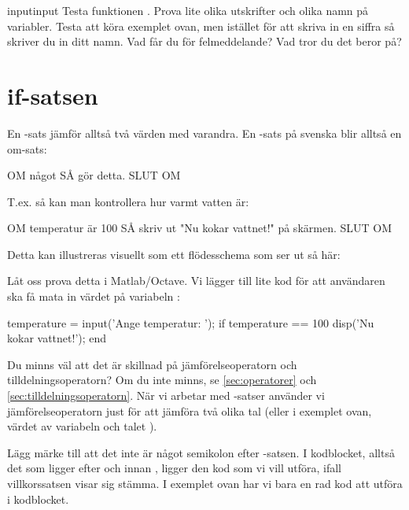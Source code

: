 \begin{matteovning}{input}{input}
Testa funktionen . Prova lite olika utskrifter och olika namn på variabler.
\newline
\newline
Testa att köra exemplet ovan, men istället för att skriva in en siffra så skriver du in ditt namn. Vad får du för felmeddelande? Vad tror du det beror på?
\end{matteovning}


\section{if-satsen}
En -sats jämför alltså två värden med varandra. En -sats på svenska blir alltså en om-sats:

\begin{pseudo}
OM något SÅ
	gör detta.
SLUT OM
\end{pseudo}

T.ex. så kan man kontrollera hur varmt vatten är:

\begin{pseudo}
OM temperatur är 100 SÅ
	skriv ut "Nu kokar vattnet!" på skärmen.
SLUT OM
\end{pseudo}
Detta kan illustreras visuellt som ett flödesschema som ser ut så här:


\newpage
Låt oss prova detta i Matlab/Octave. Vi lägger till lite kod för att användaren ska få mata in värdet på variabeln :

\begin{matlab}[caption={Vår första if-sats},label={code:kokar1}]
temperature = input('Ange temperatur: ');
if temperature == 100
    disp('Nu kokar vattnet!');
end
\end{matlab}

Du minns väl att det är skillnad på jämförelseoperatorn och tilldelningsoperatorn? Om du inte minns, se \autoref{sec:operatorer} och \autoref{sec:tilldelningsoperatorn}. När vi arbetar med -satser använder vi jämförelseoperatorn just för att jämföra två olika tal (eller i exemplet ovan, värdet av variabeln  och talet ).

Lägg märke till att det inte är något semikolon \cw{;} efter -satsen. I kodblocket, alltså det som ligger efter  och innan , ligger den kod som vi vill utföra, ifall villkorssatsen visar sig stämma. I exemplet ovan har vi bara en rad kod att utföra i kodblocket.

